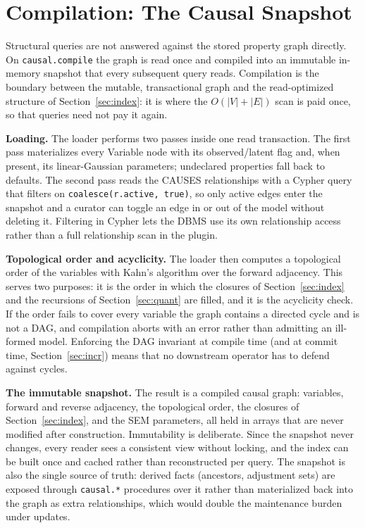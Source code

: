 \section{Compilation: The Causal Snapshot}\label{sec:compile}

Structural queries are not answered against the stored property graph
directly. On \texttt{causal.compile} the graph is read once and compiled into
an immutable in-memory snapshot that every subsequent query reads. Compilation
is the boundary between the mutable, transactional graph and the
read-optimized structure of Section~\ref{sec:index}: it is where the
$O(|V|+|E|)$ scan is paid once, so that queries need not pay it again.

\noindent\textbf{Loading.} The loader performs two passes inside one read
transaction. The first pass materializes every \textsf{Variable} node with its
\textsf{observed}/\textsf{latent} flag and, when present, its linear-Gaussian
parameters; undeclared properties fall back to defaults. The second pass reads
the \textsf{CAUSES} relationships with a Cypher query that filters on
\lstinline[style=causaldsl]|coalesce(r.active, true)|, so only active edges
enter the snapshot and a curator can toggle an edge in or out of the model
without deleting it. Filtering in Cypher lets the DBMS use its own
relationship access rather than a full relationship scan in the plugin.

\noindent\textbf{Topological order and acyclicity.} The loader then computes
a topological order of the variables with Kahn's algorithm over the forward
adjacency. This serves two purposes: it is the order in which the closures of
Section~\ref{sec:index} and the recursions of Section~\ref{sec:quant} are
filled, and it is the acyclicity check. If the order fails to cover every
variable the graph contains a directed cycle and is not a DAG, and compilation
aborts with an error rather than admitting an ill-formed model. Enforcing the
DAG invariant at compile time (and at commit time, Section~\ref{sec:incr})
means that no downstream operator has to defend against cycles.

\noindent\textbf{The immutable snapshot.} The result is a compiled causal
graph: variables, forward and reverse adjacency, the topological order, the
closures of Section~\ref{sec:index}, and the SEM parameters, all held in
arrays that are never modified after construction. Immutability is deliberate.
Since the snapshot never changes, every reader sees a consistent view without
locking, and the index can be built once and cached rather than reconstructed
per query. The snapshot is also the single source of truth: derived facts
(ancestors, adjustment sets) are exposed through \texttt{causal.*} procedures
over it rather than materialized back into the graph as extra relationships,
which would double the maintenance burden under updates.

